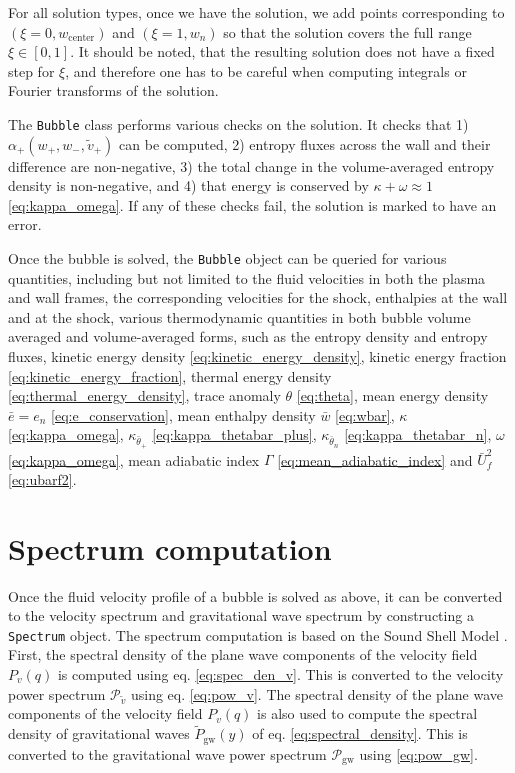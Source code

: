 For all solution types, once we have the solution,
we add points corresponding to $(\xi=0, w_\text{center})$ and $(\xi=1, w_n)$
so that the solution covers the full range $\xi \in [0, 1]$.
It should be noted, that the resulting solution does not have a fixed step for $\xi$,
and therefore one has to be careful when computing integrals or Fourier transforms of the solution.

The \verb|Bubble| class performs various checks on the solution.
It checks that
1) $\alpha_+(w_+, w_-, \tilde{v}_+)$ can be computed,
2) entropy fluxes across the wall and their difference are non-negative,
3) the total change in the volume-averaged entropy density is non-negative, and
4) that energy is conserved by $\kappa + \omega \approx 1$ \eqref{eq:kappa_omega}.
If any of these checks fail, the solution is marked to have an error.

Once the bubble is solved, the \verb|Bubble| object can be queried for various quantities,
including but not limited to the fluid velocities in both the plasma and wall frames,
the corresponding velocities for the shock,
enthalpies at the wall and at the shock,
various thermodynamic quantities in both bubble volume averaged and volume-averaged forms,
such as the entropy density and entropy fluxes,
kinetic energy density \eqref{eq:kinetic_energy_density},
kinetic energy fraction \eqref{eq:kinetic_energy_fraction},
thermal energy density \eqref{eq:thermal_energy_density},
trace anomaly $\theta$ \eqref{eq:theta},
mean energy density $\bar{e} = e_n$ \eqref{eq:e_conservation},
mean enthalpy density $\bar{w}$ \eqref{eq:wbar},
$\kappa$ \eqref{eq:kappa_omega},
$\kappa_{\bar{\theta}_+}$ \eqref{eq:kappa_thetabar_plus},
$\kappa_{\bar{\theta}_n}$ \eqref{eq:kappa_thetabar_n},
$\omega$ \eqref{eq:kappa_omega},
mean adiabatic index $\Gamma$ \eqref{eq:mean_adiabatic_index} and
$\bar{U}_f^2$ \eqref{eq:ubarf2}.


\section{Spectrum computation}
Once the fluid velocity profile of a bubble is solved as above,
it can be converted to the velocity spectrum and gravitational wave spectrum by constructing a \verb|Spectrum| object.
The spectrum computation is based on the Sound Shell Model \cite{hindmarsh_gw_pt_2019}.
First, the spectral density of the plane wave components of the velocity field $P_v(q)$ is computed using eq. \eqref{eq:spec_den_v}.
This is converted to the velocity power spectrum $\mathcal{P}_{\tilde{v}}$ using eq. \eqref{eq:pow_v}.
The spectral density of the plane wave components of the velocity field $P_v(q)$ is also used to compute the spectral density of gravitational waves $\tilde{P}_{\text{gw}}(y)$ of eq. \eqref{eq:spectral_density}.
This is converted to the gravitational wave power spectrum $\mathcal{P}_{\text{gw}}$ using \eqref{eq:pow_gw}.


